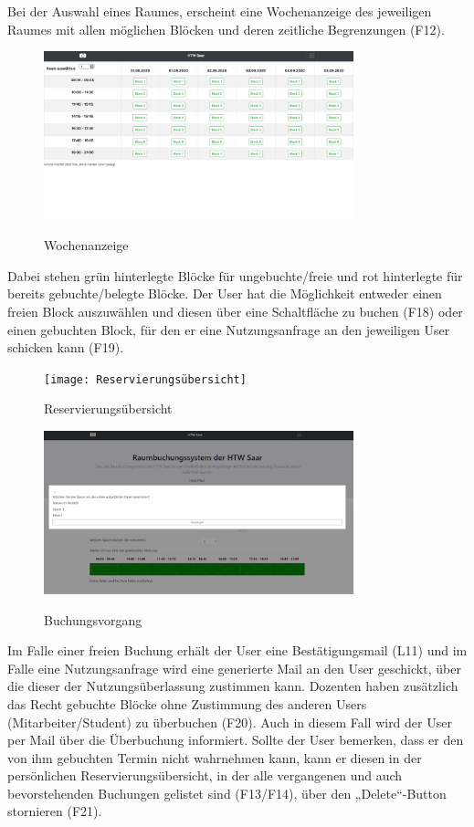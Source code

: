 \documentclass[a4paper,report,headsepline]{scrreprt}
\begin{document}
Bei der Auswahl eines Raumes, erscheint eine Wochenanzeige des jeweiligen Raumes mit allen möglichen Blöcken und deren zeitliche Begrenzungen (F12).
\begin{figure}[h]
    \centering
    \caption{Wochenanzeige}
    \includegraphics[width=0.8\textwidth]{Wochenanzeige}
    \label{fig:Wochenanzeige}
\end{figure}
\clearpage
Dabei stehen grün hinterlegte Blöcke für ungebuchte/freie und rot hinterlegte für bereits gebuchte/belegte Blöcke. Der User hat die Möglichkeit entweder einen freien Block auszuwählen und diesen über eine Schaltfläche zu buchen (F18) oder einen gebuchten Block, für den er eine Nutzungsanfrage an den jeweiligen User schicken kann (F19).
\begin{figure}[h]
    \centering
    \caption{Reservierungsübersicht}
    \texttt{[image: Reservierungsübersicht]}
    \label{fig:Reservierungsübersicht}
\end{figure}
\begin{figure}[h]
    \centering
    \caption{Buchungsvorgang}
    \includegraphics[width=0.8\textwidth]{Buchungsvorgang}
    \label{fig:Buchungsvorgang}
\end{figure}
Im Falle einer freien Buchung erhält der User eine Bestätigungsmail (L11) und im Falle eine Nutzungsanfrage wird eine generierte Mail an den User geschickt, über die dieser der Nutzungsüberlassung zustimmen kann. Dozenten haben zusätzlich das Recht gebuchte Blöcke ohne Zustimmung des anderen Users (Mitarbeiter/Student) zu überbuchen (F20). Auch in diesem Fall wird der User per Mail über die Überbuchung informiert. Sollte der User bemerken, dass er den von ihm gebuchten Termin nicht wahrnehmen kann, kann er diesen in der persönlichen Reservierungsübersicht, in der alle vergangenen und auch bevorstehenden Buchungen gelistet sind (F13/F14), über den „Delete“-Button stornieren (F21).
\end{document}
